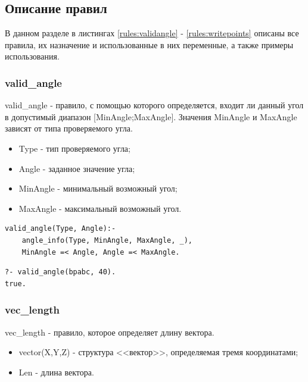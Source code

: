 \subsection{Описание правил}
\hspace{0.6cm} В данном разделе в листингах \ref{rules:validangle} - \ref{rules:writepoints} описаны все правила, их назначение и использованные в них переменные, а также примеры использования.

\subsubsection{valid\_angle}
\hspace{0.6cm} valid\_angle - правило, с помощью которого определяется, входит ли данный угол в допустимый диапазон [MinAngle;MaxAngle]. Значения MinAngle и MaxAngle зависят от типа проверяемого угла.

\begin{itemize}
	\item Type - тип проверяемого угла;
	\item Angle - заданное значение угла;
	\item MinAngle - минимальный возможный угол;
	\item MaxAngle - максимальный возможный угол.
\end{itemize}

\begin{lstlisting}[caption=Реализация правила valid\_angle, label=rules:validangle]
valid_angle(Type, Angle):-
	angle_info(Type, MinAngle, MaxAngle, _),
	MinAngle =< Angle, Angle =< MaxAngle.
\end{lstlisting}

\begin{lstlisting}[caption=Пример использования правила valid\_angle, label=example:validangle]
?- valid_angle(bpabc, 40).
true.
\end{lstlisting}


\subsubsection{vec\_length}
\hspace{0.6cm} vec\_length - правило, которое определяет длину вектора.

\begin{itemize}
	\item vector(X,Y,Z) - структура <<вектор>>, определяемая тремя координатами;
	\item Len - длина вектора.
\end{itemize}

